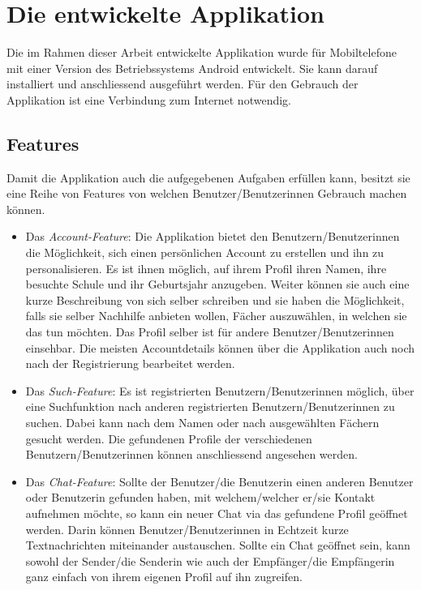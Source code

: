 \documentclass[a4paper,11pt]{report}
\begin{document}
		
	\chapter{Die entwickelte Applikation}
	Die im Rahmen dieser Arbeit entwickelte Applikation wurde für Mobiltelefone mit einer Version des Betriebssystems Android entwickelt. Sie kann darauf installiert und anschliessend ausgeführt werden. Für den Gebrauch der Applikation ist eine Verbindung zum Internet notwendig.
	
	\section{Features}
	Damit die Applikation auch die aufgegebenen Aufgaben erfüllen kann, besitzt sie eine Reihe von Features von welchen Benutzer/Benutzerinnen Gebrauch machen können.
	
	\begin{itemize}
		\item Das \emph{Account-Feature}: Die Applikation bietet den Benutzern/Benutzerinnen die Möglichkeit, sich einen persönlichen Account zu erstellen und ihn zu personalisieren. Es ist ihnen möglich, auf ihrem Profil ihren Namen, ihre besuchte Schule und ihr Geburtsjahr anzugeben. Weiter können sie auch eine kurze Beschreibung von sich selber schreiben und sie haben die Möglichkeit, falls sie selber Nachhilfe anbieten wollen, Fächer auszuwählen, in welchen sie das tun möchten. Das Profil selber ist für andere Benutzer/Benutzerinnen einsehbar. Die meisten Accountdetails können über die Applikation auch noch nach der Registrierung bearbeitet werden.
		\item Das \emph{Such-Feature}: Es ist registrierten Benutzern/Benutzerinnen möglich, über eine Suchfunktion nach anderen registrierten Benutzern/Benutzerinnen zu suchen. Dabei kann nach dem Namen oder nach ausgewählten Fächern gesucht werden. Die gefundenen Profile der verschiedenen Benutzern/Benutzerinnen können anschliessend angesehen werden.
		\item Das \emph{Chat-Feature}: Sollte der Benutzer/die Benutzerin einen anderen Benutzer oder Benutzerin gefunden haben, mit welchem/welcher er/sie Kontakt aufnehmen möchte, so kann ein neuer Chat via das gefundene Profil geöffnet werden. Darin können Benutzer/Benutzerinnen in Echtzeit kurze Textnachrichten miteinander austauschen. Sollte ein Chat geöffnet sein, kann sowohl der Sender/die Senderin wie auch der Empfänger/die Empfängerin ganz einfach von ihrem eigenen Profil auf ihn zugreifen.
	\end{itemize}
\end{document}
